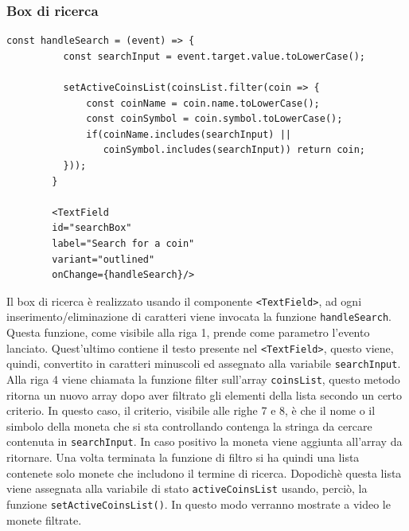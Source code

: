 \documentclass[a4paper]{article}
\begin{document}
        \subsubsection{Box di ricerca}
        \begin{lstlisting}[style=ES6, title={Funzione fetchCoins}]
        const handleSearch = (event) => {
          const searchInput = event.target.value.toLowerCase();
  
          setActiveCoinsList(coinsList.filter(coin => {
              const coinName = coin.name.toLowerCase();
              const coinSymbol = coin.symbol.toLowerCase();
              if(coinName.includes(searchInput) || 
                 coinSymbol.includes(searchInput)) return coin;
          }));
        }

        <TextField 
        id="searchBox"
        label="Search for a coin"
        variant="outlined"
        onChange={handleSearch}/> \end{lstlisting}
        Il box di ricerca è realizzato usando il componente \verb|<TextField>|, ad ogni inserimento/eliminazione di caratteri viene invocata la funzione \verb|handleSearch|.
        Questa funzione, come visibile alla riga 1, prende come parametro l'evento lanciato. Quest'ultimo contiene il testo presente nel \verb|<TextField>|,
        questo viene, quindi, convertito in caratteri minuscoli ed assegnato alla variabile \verb|searchInput|. Alla riga 4 viene chiamata la funzione filter sull'array \verb|coinsList|,
        questo metodo ritorna un nuovo array dopo aver filtrato gli elementi della lista secondo un certo criterio. In questo caso, il criterio, visibile alle righe 7 e 8,
        è che il nome o il simbolo della moneta che si sta controllando contenga la stringa da cercare contenuta in \verb|searchInput|. In caso positivo la moneta viene aggiunta all'array da ritornare.
        Una volta terminata la funzione di filtro si ha quindi una lista contenete solo monete che includono il termine di ricerca. Dopodichè questa lista viene assegnata alla variabile di stato \verb|activeCoinsList| usando,
        perciò, la funzione \verb|setActiveCoinsList()|. In questo modo verranno mostrate a video le monete filtrate. 
\end{document}
